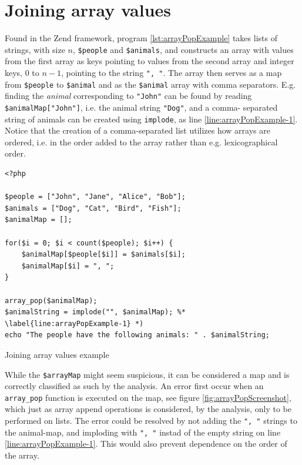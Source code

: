 \newpage
\section{Joining array values}
Found in the Zend framework, program \ref{lst:arrayPopExample} takes lists of strings, with 
size $n$, \texttt{\$people} and \texttt{\$animals}, and constructs an array with values from 
the first array as keys pointing to values from the second array and integer keys, $0$ to 
$n-1$, pointing to the string \texttt{", "}. The array then serves as a map from 
\texttt{\$people} to \texttt{\$animal} and as the \texttt{\$animal} array with comma 
separators. E.g. finding the \textit{animal} corresponding to \texttt{"John"} can be found by 
reading \texttt{\$animalMap["John"]}, i.e. the animal string \texttt{"Dog"}, and a comma-
separated string of animals can be created using \texttt{implode}, as line 
\ref{line:arrayPopExample-1}. Notice that the creation of a comma-separated list utilizes how 
arrays are ordered, i.e. in the order added to the array rather than e.g. lexicographical 
order. 

\begin{program}
\begin{lstlisting}
<?php

$people = ["John", "Jane", "Alice", "Bob"];
$animals = ["Dog", "Cat", "Bird", "Fish"];
$animalMap = [];

for($i = 0; $i < count($people); $i++) {
    $animalMap[$people[$i]] = $animals[$i];
    $animalMap[$i] = ", ";
}

array_pop($animalMap);
$animalString = implode("", $animalMap); %* \label{line:arrayPopExample-1} *)
echo "The people have the following animals: " . $animalString;
\end{lstlisting}
\caption{Joining array values example}
\label{lst:arrayPopExample}
\end{program}


While the \texttt{\$arrayMap} might seem suspicious, it can be considered a map and is 
correctly classified as such by the analysis. An error first occur when an 
\texttt{array\_pop} function is executed on the map, see figure \ref{fig:arrayPopScreenshot}, which just as 
array append operations is considered, by the analysis, only to be performed on lists. The error could be 
resolved by not adding the \texttt{", "} strings to the animal-map, and imploding with \texttt{", "} instad of the empty string on line \ref{line:arrayPopExample-1}. This would also prevent dependence on the order of the array.

